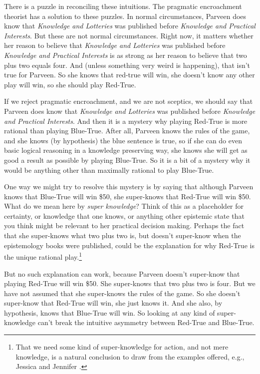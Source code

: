 There is a puzzle in reconciling these intuitions. The pragmatic encroachment theorist has a solution to these puzzles. In normal circumstances, Parveen does know that \emph{Knowledge and Lotteries} was published before \emph{Knowledge and Practical Interests}. But these are not normal circumstances. Right now, it matters whether her reason to believe that \emph{Knowledge and Lotteries} was published before \emph{Knowledge and Practical Interests} is as strong as her reason to believe that two plus two equals four. And (unless something very weird is happening), that isn't true for Parveen. So she knows that red-true will win, she doesn't know any other play will win, so she should play Red-True.

If we reject pragmatic encroachment, and we are not sceptics, we should say that Parveen does know that \emph{Knowledge and Lotteries} was published before \emph{Knowledge and Practical Interests}. And then it is a mystery why playing Red-True is more rational than playing Blue-True. After all, Parveen knows the rules of the game, and she knows (by hypothesis) the blue sentence is true, so if she can do even basic logical reasoning in a knowledge preserving way, she knows she will get as good a result as possible by playing Blue-True. So it is a bit of a mystery why it would be anything other than maximally rational to play Blue-True.

One way we might try to resolve this mystery is by saying that although Parveen knows that Blue-True will win \$50, she super-knows that Red-True will win \$50. What do we mean here by \emph{super knowledge}? Think of this as a placeholder for certainty, or knowledge that one knows, or anything other epistemic state that you think might be relevant to her practical decision making. Perhaps the fact that she super-knows what two plus two is, but doesn't super-know when the epistemology books were published, could be the explanation for why Red-True is the unique rational play.\footnote{That we need some kind of super-knowledge for action, and not mere knowledge, is a natural conclusion to draw from the examples offered, e.g., Jessica  \citet{Brown2008} and Jennifer  \citet{Lackey2010}.}

But no such explanation can work, because Parveen doesn't super-know that playing Red-True will win \$50. She super-knows that two plus two is four. But we have not assumed that she super-knows the rules of the game. So she doesn't super-know that Red-True will win, she just knows it. And she also, by hypothesis, knows that Blue-True will win. So looking at any kind of super-knowledge can't break the intuitive asymmetry between Red-True and Blue-True.

